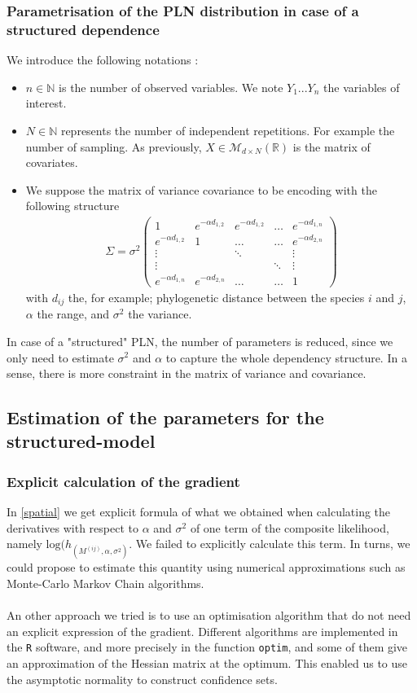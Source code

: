 \documentclass[11pt, a4paper]{article}
\begin{document}
\subsubsection{Parametrisation of the PLN distribution in case of a structured dependence}
We introduce the following notations : 
\begin{itemize}
\item $n \in \mathbb{N}$ is the number of observed variables. We note $Y_1...Y_n$ the variables of interest.
\item $N \in \mathbb{N}$ represents the number of independent repetitions. For example the number of sampling. As previously, $X \in \mathcal{M}_{d \times N}(\mathbb{R})$ is the matrix of covariates.
\item We suppose the matrix of variance covariance to be encoding with the following structure
\begin{align*}
\Sigma = \sigma^2 \begin{pmatrix}
1 &  e^{-\alpha d_{1,2}} &  e^{-\alpha d_{1,2}} & \ldots &  e^{- \alpha d_{1,n}}  \\
 e^{-\alpha d_{1,2}} & 1 & \ldots & \ldots &  e^{- \alpha d_{2,n}}\\
 \vdots & & \ddots & & \vdots\\
 \vdots & & & \ddots & \vdots \\
 e^{-\alpha d_{1,n}} &  e^{-\alpha d_{2,n}} & \ldots & \ldots & 1 
\end{pmatrix}
\end{align*} 
with $d_{ij}$ the, for example; phylogenetic distance between the species $i$ and $j$, $\alpha$ the range, and $\sigma^2$ the variance.
\end{itemize}
 
 In case of a "structured" PLN, the number of parameters is reduced, since we only need to estimate $\sigma^2$ and $\alpha$ to capture the whole dependency structure. In a sense, there is more constraint in the matrix of variance and covariance.
\subsection{Estimation of the parameters for the structured-model }
\subsubsection{Explicit calculation of the gradient}
In \ref{spatial} we get explicit formula of what we obtained when calculating the derivatives with respect to $\alpha$ and $\sigma^2$ of one term of the composite likelihood, namely $\mathrm{log}(h_{(M^{(ij)},\alpha, \sigma^2)}$. We failed to explicitly calculate this term. In turns, we could propose to estimate this quantity using  numerical approximations such as Monte-Carlo Markov Chain algorithms.\\
\\
An other approach we tried is to use an optimisation algorithm that do not need an explicit expression of the gradient. Different algorithms are implemented in the \texttt{R} software, and more precisely in the function \texttt{optim},   and some of them give an approximation of the Hessian matrix at the optimum. This enabled us to use the asymptotic normality to construct confidence sets.
\end{document}
